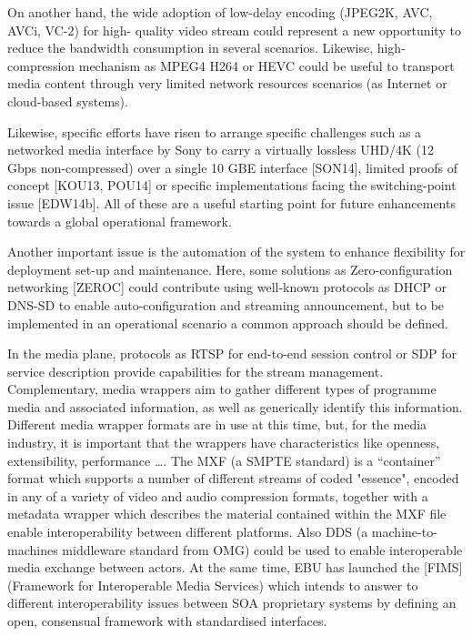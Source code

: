 On another hand, the wide adoption of low-delay encoding (JPEG2K, AVC, AVCi, VC-2) for high-
quality video stream could represent a new opportunity to reduce the bandwidth consumption in
several scenarios. Likewise, high-compression mechanism as MPEG4 H264 or HEVC could be
useful to transport media content through very limited network resources scenarios (as Internet or
cloud-based systems).

Likewise, specific efforts have risen to arrange specific challenges such as a networked media
interface by Sony to carry a virtually lossless UHD/4K (12 Gbps non-compressed) over a single 10
GBE interface [SON14], limited proofs of concept [KOU13, POU14] or specific implementations
facing the switching-point issue [EDW14b]. All of these are a useful starting point for future
enhancements towards a global operational framework.

Another important issue is the automation of the system to enhance flexibility for deployment set-up
and maintenance. Here, some solutions as Zero-configuration networking [ZEROC] could contribute
using well-known protocols as DHCP or DNS-SD to enable auto-configuration and streaming
announcement, but to be implemented in an operational scenario a common approach should be
defined.

In the media plane, protocols as RTSP for end-to-end session control or SDP for service description
provide capabilities for the stream management. Complementary, media wrappers aim to gather
different types of programme media and associated information, as well as generically identify this
information. Different media wrapper formats are in use at this time, but, for the media industry, it is
important that the wrappers have characteristics like openness, extensibility, performance \ldots . The MXF (a SMPTE standard) is a “container” format which supports a number of different streams of coded
"essence", encoded in any of a variety of video and audio compression formats, together with a
metadata wrapper which describes the material contained within the MXF file enable interoperability
between different platforms. Also DDS (a machine-to-machines middleware standard from OMG)
could be used to enable interoperable media exchange between actors. At the same time, EBU has
launched the [FIMS] (Framework for Interoperable Media Services) which intends to answer to
different interoperability issues between SOA proprietary systems by defining an open, consensual
framework with standardised interfaces.

